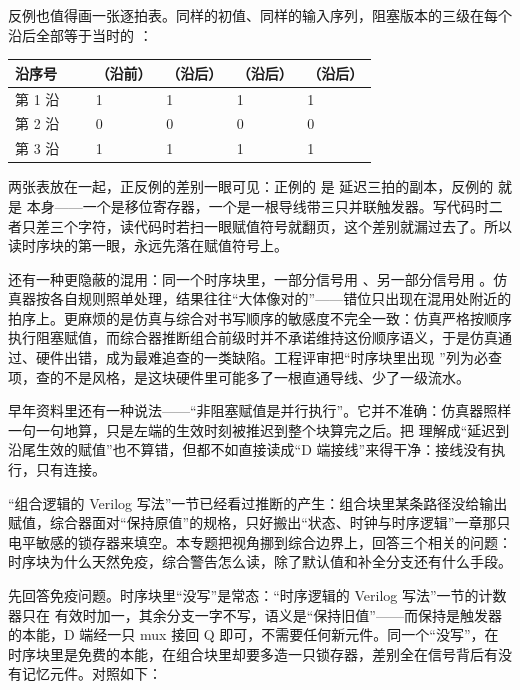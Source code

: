 反例也值得画一张逐拍表。同样的初值、同样的输入序列，阻塞版本的三级在每个沿后全部等于当时的 ：

\begin{longtable}{L{0.16\linewidth}L{0.14\linewidth}L{0.14\linewidth}L{0.14\linewidth}L{0.14\linewidth}}
\toprule
沿序号 & （沿前） & （沿后） & （沿后） & （沿后） \\
\midrule
第 1 沿 & 1 & 1 & 1 & 1 \\\tablerowrule
第 2 沿 & 0 & 0 & 0 & 0 \\\tablerowrule
第 3 沿 & 1 & 1 & 1 & 1 \\
\bottomrule
\end{longtable}

两张表放在一起，正反例的差别一眼可见：正例的  是  延迟三拍的副本，反例的  就是  本身——一个是移位寄存器，一个是一根导线带三只并联触发器。写代码时二者只差三个字符，读代码时若扫一眼赋值符号就翻页，这个差别就漏过去了。所以读时序块的第一眼，永远先落在赋值符号上。

还有一种更隐蔽的混用：同一个时序块里，一部分信号用 \code{<=}、另一部分信号用 \code{=}。仿真器按各自规则照单处理，结果往往“大体像对的”——错位只出现在混用处附近的拍序上。更麻烦的是仿真与综合对书写顺序的敏感度不完全一致：仿真严格按顺序执行阻塞赋值，而综合器推断组合前级时并不承诺维持这份顺序语义，于是仿真通过、硬件出错，成为最难追查的一类缺陷。工程评审把“时序块里出现 \code{=}”列为必查项，查的不是风格，是这块硬件里可能多了一根直通导线、少了一级流水。

早年资料里还有一种说法——“非阻塞赋值是并行执行”。它并不准确：仿真器照样一句一句地算，只是左端的生效时刻被推迟到整个块算完之后。把 \code{<=} 理解成“延迟到沿尾生效的赋值”也不算错，但都不如直接读成“D 端接线”来得干净：接线没有执行，只有连接。


“组合逻辑的 Verilog 写法”一节已经看过推断的产生：组合块里某条路径没给输出赋值，综合器面对“保持原值”的规格，只好搬出“状态、时钟与时序逻辑”一章那只电平敏感的锁存器来填空。本专题把视角挪到综合边界上，回答三个相关的问题：时序块为什么天然免疫，综合警告怎么读，除了默认值和补全分支还有什么手段。

先回答免疫问题。时序块里“没写”是常态：“时序逻辑的 Verilog 写法”一节的计数器只在  有效时加一，其余分支一字不写，语义是“保持旧值”——而保持是触发器的本能，D 端经一只 mux 接回 Q 即可，不需要任何新元件。同一个“没写”，在时序块里是免费的本能，在组合块里却要多造一只锁存器，差别全在信号背后有没有记忆元件。对照如下：

